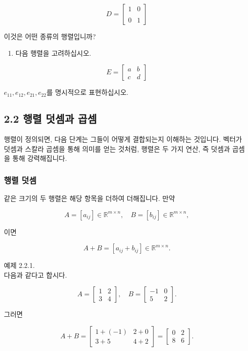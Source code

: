 \documentclass[
  12pt,
  a4paper,
]{article}
\begin{document}
\[D = \begin{bmatrix} 1 & 0 \\\\ 0 & 1 \end{bmatrix}\]

이것은 어떤 종류의 행렬입니까?

\begin{enumerate}
\def\labelenumi{\arabic{enumi}.}
\item
  다음 행렬을 고려하십시오.
\end{enumerate}

\[E = \begin{bmatrix} a & b \\ c & d \end{bmatrix}\]

\(e_{11}, e_{12}, e_{21}, e_{22}\)를 명시적으로 표현하십시오.

\subsection{2.2 행렬 덧셈과 곱셈}\label{22-matrix-addition-and-multiplication}

행렬이 정의되면, 다음 단계는 그들이 어떻게 결합되는지 이해하는 것입니다. 벡터가 덧셈과 스칼라 곱셈을 통해 의미를 얻는 것처럼, 행렬은 두 가지 연산, 즉 덧셈과 곱셈을 통해 강력해집니다.

\subsubsection{행렬 덧셈}\label{matrix-addition}

같은 크기의 두 행렬은 해당 항목을 더하여 더해집니다. 만약

\[A = [a_{ij}] \in \mathbb{R}^{m \times n}, \quad
B = [b_{ij}] \in \mathbb{R}^{m \times n},\]

이면

\[A + B = [a_{ij} + b_{ij}] \in \mathbb{R}^{m \times n}.\]

예제 2.2.1.\\
다음과 같다고 합시다.

\[A = \begin{bmatrix}
1 & 2 \\
3 & 4
\end{bmatrix}, \quad
B = \begin{bmatrix}
-1 & 0 \\
5 & 2
\end{bmatrix}.\]

그러면

\[A + B = \begin{bmatrix}
1 + (-1) & 2 + 0 \\
3 + 5 & 4 + 2
\end{bmatrix} =
\begin{bmatrix}
0 & 2 \\
8 & 6
\end{bmatrix}.\]
\end{document}
